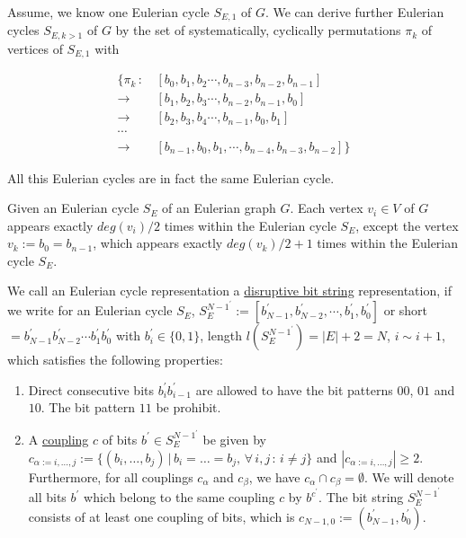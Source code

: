 \documentclass{article}
\newtheorem*{theorem A}{Theorem A}
\newtheorem*{theorem B}{N\"olker's Theorem}
\theoremstyle{remark}
\theoremstyle{remark}
\begin{document}
\vspace{0.3cm}
Assume, we know one Eulerian cycle $S_{E,1}$ of $G$. We can derive further Eulerian cycles $S_{E, k > 1}$ of $G$ by the set of systematically, cyclically permutations $\pi_{k}$ of vertices of $S_{E,1}$ with

\begin{equation*}
    \begin{split}
         \{ \pi_{k} \, : \,     & \left[ b_{0}, b_{1}, b_{2} \cdots, b_{n-3}, b_{n-2}, b_{n-1} \right]\\
            \rightarrow         & \left[ b_{1}, b_{2}, b_{3} \cdots, b_{n-2}, b_{n-1}, b_{0} \right]\\
            \rightarrow         & \left[ b_{2}, b_{3}, b_{4} \cdots, b_{n-1}, b_{0}, b_{1} \right]\\
            \cdots\\
            \rightarrow         & \left[ b_{n-1}, b_{0}, b_{1}, \cdots, b_{n-4}, b_{n-3}, b_{n-2} \right] \}
    \label{eq:euleriancycles}
    \end{split}
\end{equation*}

All this Eulerian cycles are in fact the same Eulerian cycle.

\vspace{0.3cm}
Given an Eulerian cycle $S_{E}$ of an Eulerian graph $G$. Each vertex $v_{i} \in V$ of $G$ appears exactly $deg\left(v_{i}\right)/2$ times within the Eulerian cycle $S_{E}$, except the vertex $v_{k} := b_{0} = b_{n-1}$, which appears exactly $deg\left(v_{k}\right)/2 + 1$ times within the Eulerian cycle $S_{E}$.

\vspace{0.3cm}
We call an Eulerian cycle representation a \underline{disruptive bit string} representation, if we write for an Eulerian cycle $S_{E}$, $S_{E}^{N-1^\prime} := \left[b^{\prime}_{N-1}, b^{\prime}_{N-2}, \cdots, b^{\prime}_{1}, b^{\prime}_{0}\right]$ or short $ = b^{\prime}_{N-1}b^{\prime}_{N-2} \cdots b^{\prime}_{1}b^{\prime}_{0}$ with $b^{\prime}_{i} \in \{ 0, 1 \}$, length $l\left(S^{N-1^{\prime}}_{E}\right) = |E| + 2 = N$, $i \sim i + 1$, which satisfies the following properties:

\begin{enumerate}
    \item Direct consecutive bits $b^{\prime}_{i}b^{\prime}_{i-1}$ are allowed to have the bit patterns $00$, $01$ and $10$. The bit pattern $11$ be prohibit.

    \item A \underline{coupling} $c$ of bits $b^{\prime} \in S^{N-1^\prime}_{E}$ be given by $c_{\alpha := i, \dots, j} := \{ \left(b_{i}, \dots, b_{j}\right) \, | \, b_{i} = \dots = b_{j}, \, \forall \, i,j \, : \, i \neq j \}$ and $|c_{\alpha := i, \dots, j}| \geq 2$. Furthermore, for all couplings $c_{\alpha}$ and $c_{\beta}$, we have $c_{\alpha} \cap c_{\beta} = \emptyset$. We will denote all bits $b^{\prime}$ which belong to the same coupling $c$ by $b^{c^\prime}$. The bit string $S^{N-1^\prime}_{E}$ consists of at least one coupling of bits, which is $c_{N-1,0} := \left(b^{\prime}_{N-1}, b^{\prime}_{0}\right)$.
\label{enum:distruptivebitstringrep}
\end{enumerate}
\end{document}
